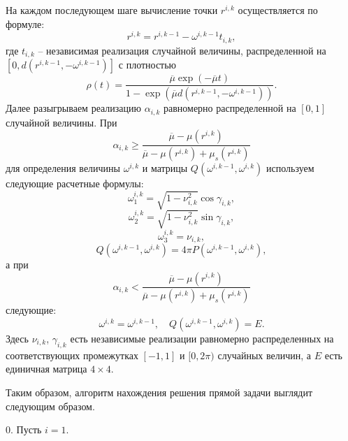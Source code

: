 На каждом последующем шаге вычисление точки $r^{i,k}$
осуществляется по формуле:
\begin{equation}
    \label{2-54}
    r^{i,k}=r^{i,k-1}-\omega^{i,k-1} t_{i,k},
\end{equation}
где $t_{i,k}$ -- независимая реализация случайной величины,
распределенной на $[0, d(r^{i,k-1}, -\omega^{i,k-1})]$ с
плотностью
\begin{equation}
    \label{2-55}
    \rho(t) = \frac{ \overline{\mu} \exp (-\overline{\mu} t )}{1-\exp
        (\overline{\mu} d(r^{i,k-1},-\omega^{i,k-1}))}.
\end{equation}
Далее разыгрываем реализацию $\alpha_{i,k}$ равномерно
распределенной на $[0,1]$ случайной величины. При
\begin{equation}
    \label{2-56}
    \alpha_{i,k} \geq
    \frac{\overline{\mu}-\mu(r^{i,k})}{\overline{\mu}-\mu(r^{i,k})+\mu_s(r^{i,k})}
\end{equation}
для определения величины $\omega^{i,k}$  и матрицы
$Q(\omega^{i,k-1},\omega^{i,k})$ используем следующие расчетные
формулы:
\begin{equation}
    \label{2-57}
    \omega^{i,k}_1=\sqrt{1-\nu^{2}_{i,k}}\cos \gamma_{i,k},
\end{equation}
\begin{equation}
    \label{2-58}
    \omega^{i,k}_2=\sqrt{1-\nu^{2}_{i,k}}\sin \gamma_{i,k},
\end{equation}
\begin{equation}
    \label{2-59}
    \omega^{i,k}_3=\nu_{i,k},
\end{equation}
\begin{equation}
    \label{2-60}
    Q(\omega^{i,k-1},\omega^{i,k}) = 4\pi
    P(\omega^{i,k-1},\omega^{i,k}),
\end{equation}
а при \[ \alpha_{i,k} <
\frac{\overline{\mu}-\mu(r^{i,k})}{\overline{\mu}-\mu(r^{i,k})+\mu_s(r^{i,k})}
\]
следующие:
\begin{equation}
    \label{2-61}
    \omega^{i,k} = \omega^{i,k-1}, \quad
    Q(\omega^{i,k-1},\omega^{i,k}) = E.
\end{equation}
Здесь $\nu_{i,k}$, $\gamma_{i,k}$ есть независимые реализации
равномерно распределенных на соответствующих промежутках $[-1,1]$
и $[0,2\pi)$ случайных величин, а $E$ есть единичная матрица \;$4
\times 4$.

Таким образом, алгоритм нахождения решения прямой задачи выглядит
следующим образом.

0. Пусть $i=1$.

